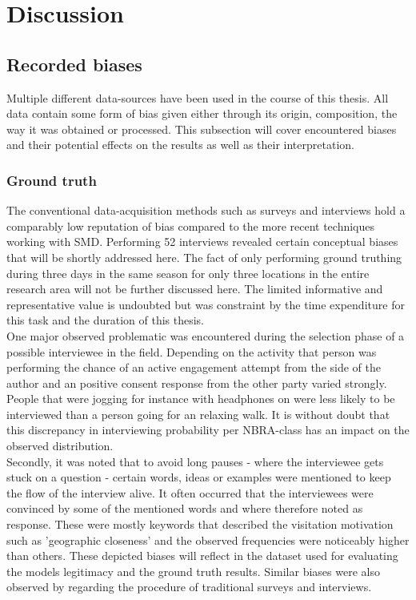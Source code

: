 \chapter{Discussion} \label{discussion}

\section{Recorded biases}
Multiple different data-sources have been used in the course of this thesis. All data contain some form of bias given either through its origin, composition, the way it was obtained or processed. 
This subsection will cover encountered biases and their potential effects on the results as well as their interpretation.

\subsection*{Ground truth}
The conventional data-acquisition methods such as surveys and interviews hold a comparably low reputation of bias compared to the more recent techniques working with SMD. Performing 52 interviews revealed certain conceptual biases that will be shortly addressed here. The fact of only performing ground truthing during three days in the same season for only three locations in the entire research area will not be further discussed here. The limited informative and representative value is undoubted but was constraint by the time expenditure for this task and the duration of this thesis. \\
\newline
One major observed problematic was encountered during the selection phase of a possible interviewee in the field. Depending on the activity that person was performing the chance of an active engagement attempt from the side of the author and an positive consent response from the other party varied strongly. People that were jogging for instance with headphones on were less likely to be interviewed than a person going for an relaxing walk. It is without doubt that this discrepancy in interviewing probability per NBRA-class has an impact on the observed distribution.\\
Secondly, it was noted that to avoid long pauses - where the interviewee gets stuck on a question - certain words, ideas or examples were mentioned to keep the flow of the interview alive. It often occurred that the interviewees were convinced by some of the mentioned words and where therefore noted as response. These were mostly keywords that described the visitation motivation such as 'geographic closeness' and the observed frequencies were noticeably higher than others. These depicted biases will reflect in the dataset used for evaluating the models legitimacy and the ground truth results. Similar biases were also observed by \parencite{Hanemann2011, Kling2012, Tenerelli2016} regarding the procedure of traditional surveys and interviews.

